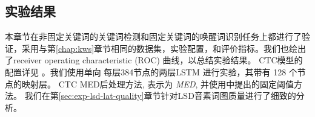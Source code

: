 %
%

\subsection{实验结果}

本章节在非固定关键词的关键词检测和固定关键词的唤醒词识别任务上都进行了验证，采用与第\ref{chap:kws}章节相同的数据集，实验配置，和评价指标。我们也绘出了receiver operating characteristic (ROC) 曲线，以总结实验结果。
CTC模型的配置详见 \cite{7736093}。我们使用单向 每层384节点的两层LSTM 进行实验，其带有 128 个节点的映射层。
CTC MED后处理方法, 表示为 {\em{MED}}, 并使用\cite{7736093}中提出的固定阈值方法。
我们在第\ref{sec:exp-lsd-lat-quality}章节针对LSD音素词图质量进行了细致的分析。

